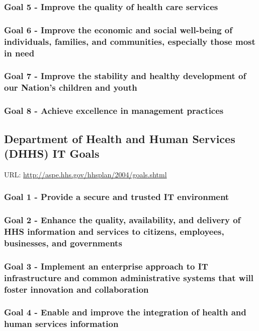 \documentclass[11pt]{article}
\begin{document}
\subsubsection{Goal 5 - Improve the quality of health care services}
\label{sec:orga668bd9}
\subsubsection{Goal 6 - Improve the economic and social well-being of individuals, families, and communities, especially those most in need}
\label{sec:org093248c}
\subsubsection{Goal 7 - Improve the stability and healthy development of our Nation’s children and youth}
\label{sec:orgba93b79}
\subsubsection{Goal 8 - Achieve excellence in management practices}
\label{sec:org40277f2}

\subsection{Department of Health and Human Services (DHHS) IT Goals}
\label{sec:orgedec7f5}
URL: \url{http://aspe.hhs.gov/hhsplan/2004/goals.shtml}
\subsubsection{Goal 1 - Provide a secure and trusted IT environment}
\label{sec:orgb371806}
\subsubsection{Goal 2 - Enhance the quality, availability, and delivery of HHS information and services to citizens, employees, businesses, and governments}
\label{sec:org7e0840b}
\subsubsection{Goal 3 - Implement an enterprise approach to IT infrastructure and common administrative systems that will foster innovation and collaboration}
\label{sec:orgc94d1e4}
\subsubsection{Goal 4 - Enable and improve the integration of health and human services information}
\label{sec:org9a710b0}
\end{document}
